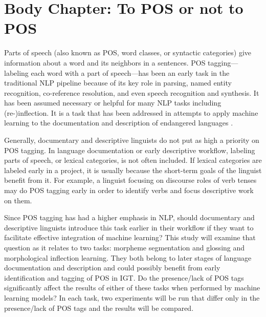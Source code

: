\section{Body Chapter: To POS or not to POS}
\label{sec:POS}

Parts of speech (also known as POS, word classes, or syntactic categories) give information about a word and its neighbors in a sentences. POS tagging---labeling each word with a part of speech---has been an early task in the traditional NLP pipeline because of its key role in parsing, named entity recognition, co-reference resolution, and even speech recognition and synthesis. It has been assumed necessary or helpful for many NLP tasks including (re-)inflection. It is a task that has been addressed in attempts to apply machine learning to the documentation and description of endangered languages \cite{cox_probabilistic_2010,de_pauw_resource-light_2012,baldridge_learning_2013,duong_natural_2017,anastasopoulos_computational_2019,millour_unsupervised_2019}. 

Generally, documentary and descriptive linguists do not put as high a priority on POS tagging. In language documentation or early descriptive workflow, labeling parts of speech, or lexical categories, is not often included. 
If lexical categories are labeled early in a project, it is usually because the short-term goals of the linguist benefit from it. For example, a linguist focusing on discourse roles of verb tenses may do POS tagging early in order to identify verbs and focus descriptive work on them. 

Since POS tagging has had a higher emphasis in NLP, should documentary and descriptive linguists introduce this task earlier in their workflow if they want to facilitate effective integration of machine learning? 
This study will examine that question as it relates to two tasks: morpheme segmentation and glossing and morphological inflection learning. They both belong to later stages of language documentation and description and could possibly benefit from early identification and tagging of POS in IGT. Do the presence/lack of POS tags significantly affect the results of either of these tasks when performed by machine learning models? In each task, two experiments will be run that differ only in the presence/lack of POS tags and the results will be compared.


